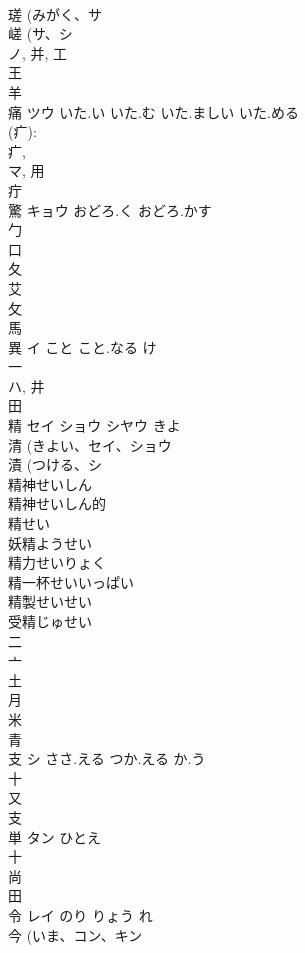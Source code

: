 \documentclass[8pt]{extreport}
\begin{document}
\begin{CJK}{UTF8}{min}
\\	瑳 (みがく、サ 
\\	嵯 (サ、シ 
\\	ノ, 并, 工 
\\	王 
\\	羊 
\\	痛	ツウ	いた.い いた.む いた.ましい いた.める	
\\	(疒): 
\\	疒, 
\\	マ, 用 
\\	疔 
\\	驚	キョウ	おどろ.く おどろ.かす	
\\	勹 
\\	口 
\\	夂 
\\	艾 
\\	攵 
\\	馬 
\\	異	イ	こと こと.なる け	
\\	一 
\\	ハ, 井 
\\	田 
\\	精	セイ ショウ シヤウ	きよ	
\\	清 (きよい、セイ、ショウ 
\\	漬 (つける、シ 
\\	精神せいしん
\\	精神せいしん的
\\	精せい
\\	妖精ようせい
\\	精力せいりょく
\\	精一杯せいいっぱい
\\	精製せいせい
\\	受精じゅせい
\\	二 
\\	亠 
\\	土 
\\	月 
\\	米 
\\	青 
\\	支	シ	ささ.える つか.える か.う	
\\	十 
\\	又 
\\	支 
\\	単	タン	ひとえ	
\\	十 
\\	尚 
\\	田 
\\	令	レイ	のり りょう れ	
\\	今 (いま、コン、キン 

\end{CJK}
\end{document}
